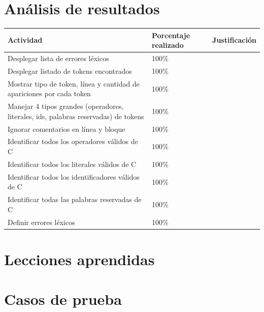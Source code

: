 \documentclass[a4paper,12pt]{article}
\begin{document}
\section*{Análisis de resultados}
\begin{table}[!ht]
    \centering
    \begin{tabularx}{\textwidth}{|X|X|X|}
        \hline
        Actividad & Porcentaje realizado & Justificación \\ 
        \hline
        Desplegar lista de errores léxicos & 100\% & \\
        \hline
        Desplegar listado de tokens encontrados & 100\% & \\
        \hline
        Mostrar tipo de token, línea y cantidad de apariciones por cada token & 100\% & \\
        \hline
        Manejar 4 tipos grandes (operadores, literales, ids, palabras reservadas) de tokens & 100\% & \\
        \hline
        Ignorar comentarios en línea y bloque & 100\% & \\
        \hline
        Identificar todos los operadores válidos de C & 100\% & \\
        \hline
        Identificar todos los literales válidos de C & 100\% & \\
        \hline
        Identificar todos los identificadores válidos de C & 100\% & \\
        \hline
        Identificar todas las palabras reservadas de C & 100\% & \\
        \hline
        Definir errores léxicos & 100\% & \\
        \hline
    \end{tabularx}
\end{table}

\section*{Lecciones aprendidas}

\section*{Casos de prueba}
\end{document}
